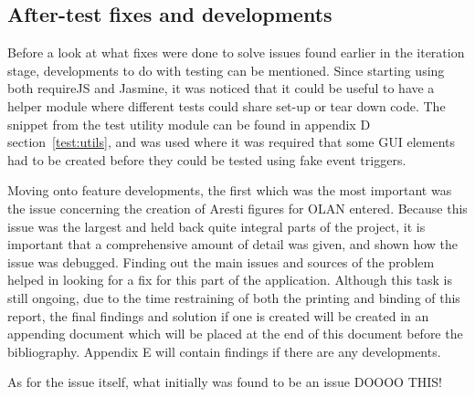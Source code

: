 \subsection{After-test fixes and developments}
Before a look at what fixes were done to solve issues found earlier in the iteration stage, developments to do with testing can be mentioned. Since starting using both requireJS and Jasmine, it was noticed that it could be useful to have a helper module where different tests could share set-up or tear down code. The snippet from the test utility module can be found in appendix D section~\ref{test:utils}, and was used where it was required that some GUI elements had to be created before they could be tested using fake event triggers.

Moving onto feature developments, the first which was the most important was the issue concerning the creation of Aresti figures for OLAN entered. Because this issue was the largest and held back quite integral parts of the project, it is important that a comprehensive amount of detail was given, and shown how the issue was debugged. Finding out the main issues and sources of the problem helped in looking for a fix for this part of the application. Although this task is still ongoing, due to the time restraining of both the printing and binding of this report, the final findings and solution if one is created will be created in an appending document which will be placed at the end of this document before the bibliography. Appendix E will contain findings if there are any developments. 

As for the issue itself, what initially was found to be an issue DOOOO THIS!

